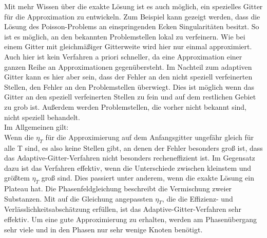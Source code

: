 Mit mehr Wissen über die exakte Lösung ist es auch möglich, ein spezielles Gitter für die Approximation zu entwickeln. Zum Beispiel kann gezeigt werden, dass die Lösung des Poisson-Problems an einspringenden Ecken Singularitäten besitzt. So ist es möglich, an den bekannten Problemstellen lokal zu verfeinern. Wie bei einem Gitter mit gleichmäßiger Gitterweite wird hier nur einmal approximiert. Auch hier ist kein Verfahren a priori schneller, da eine Approximation einer ganzen Reihe an Approximationen gegenübersteht. Im Nachteil zum adaptiven Gitter kann es hier aber sein, dass der Fehler an den nicht speziell verfeinerten Stellen, den Fehler an den Problemstellen überwiegt. Dies ist möglich wenn das Gitter an den speziell verfeinerten Stellen zu fein und auf dem restlichen Gebiet zu grob ist. Außerdem werden Problemstellen, die vorher nicht bekannt sind, nicht speziell behandelt. \\
Im Allgemeinen gilt: \\Wenn die $\eta_{T}$ für die Approximierung auf dem Anfangsgitter ungefähr gleich für alle T sind, es also keine Stellen gibt, an denen der Fehler besonders groß ist, dass das Adaptive-Gitter-Verfahren nicht besonders recheneffizient ist. Im Gegensatz dazu ist das Verfahren effektiv, wenn die Unterschiede zwischen kleinstem und größtem $\eta_{T}$ groß sind. Dies passiert unter anderem, wenn die exakte Lösung ein Plateau hat. Die Phasenfeldgleichung beschreibt die Vermischung zweier Substanzen. Mit auf die Gleichung angepassten $\eta_{T}$, die die Effizienz- und Verlässlichkeitsabschätzung erfüllen, ist das Adaptive-Gitter-Verfahren sehr effektiv. Um eine gute Approximierung zu erhalten, werden am Phasenübergang sehr viele und in den Phasen nur sehr wenige Knoten benötigt. \\
